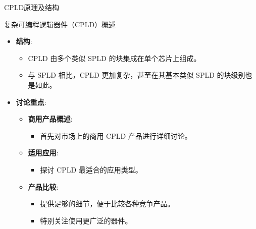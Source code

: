 \documentclass[
  ignorenonframetext,
  chinese,
]{beamer}
\providecommand{\tightlist}{%
  \setlength{\itemsep}{0pt}\setlength{\parskip}{0pt}}
\begin{document}
\begin{frame}{CPLD原理及结构}
\label{cpldux539fux7406ux53caux7ed3ux6784}
\begin{block}{复杂可编程逻辑器件（CPLD）概述}
\label{ux590dux6742ux53efux7f16ux7a0bux903bux8f91ux5668ux4ef6cpldux6982ux8ff0}
\begin{itemize}
\tightlist
\item
  \textbf{结构}:

  \begin{itemize}
  \tightlist
  \item
    CPLD 由多个类似 SPLD 的块集成在单个芯片上组成。
  \item
    与 SPLD 相比，CPLD 更加复杂，甚至在其基本类似 SPLD
    的块级别也是如此。
  \end{itemize}
\item
  \textbf{讨论重点}:

  \begin{itemize}
  \tightlist
  \item
    \textbf{商用产品概述}:

    \begin{itemize}
    \tightlist
    \item
      首先对市场上的商用 CPLD 产品进行详细讨论。
    \end{itemize}
  \item
    \textbf{适用应用}:

    \begin{itemize}
    \tightlist
    \item
      探讨 CPLD 最适合的应用类型。
    \end{itemize}
  \item
    \textbf{产品比较}:

    \begin{itemize}
    \tightlist
    \item
      提供足够的细节，便于比较各种竞争产品。
    \item
      特别关注使用更广泛的器件。
    \end{itemize}
  \end{itemize}
\end{itemize}
\end{block}
\end{frame}
\end{document}
